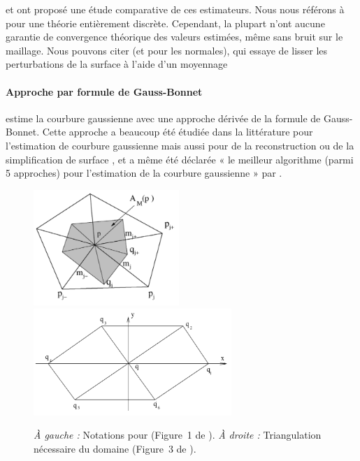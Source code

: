 %
 et  ont proposé
une étude comparative de ces estimateurs. Nous nous référons à
 pour une théorie entièrement discrète.
Cependant, la plupart n'ont aucune garantie de convergence théorique des
valeurs estimées, même sans bruit sur le maillage. Nous pouvons citer
\cite{Rusinkiewicz2004} (et \cite{Page2002} pour les normales), qui essaye de lisser les perturbations de la surface à l'aide d'un moyennage

\paragraph{Approche par formule de Gauss-Bonnet}
%
 estime la courbure gaussienne avec une approche dérivée de
la formule de Gauss-Bonnet. Cette approche a beaucoup été
étudiée dans la littérature pour l'estimation de courbure gaussienne
\cite{Meek2000, Stokely1992} mais aussi pour de la reconstruction \cite{Dyn2001}
ou de la simplification de surface \cite{Kim2002}, et a même été déclarée « le
meilleur algorithme (parmi 5 approches) pour l'estimation de la courbure
gaussienne » par .

\begin{figure}[ht]
    \begin{center}
      \includegraphics[width=5.5cm]{images/Curvature/Notations_Xu}
      \includegraphics[width=7.5cm]{images/Curvature/Notations_Xu_2}
    \end{center}
    \caption[Notations pour .]{\emph{À gauche :} Notations pour  (Figure~1 de \cite{Xu2006}). \emph{À droite :} Triangulation nécessaire du domaine (Figure~3 de \cite{Xu2006}).}
    \label{fig:xu_notations}
\end{figure}


